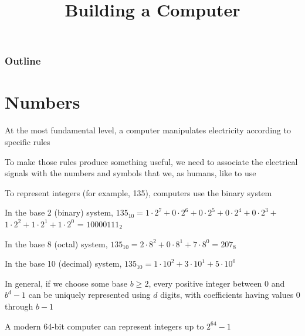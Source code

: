 \documentclass[8pt,a4paper,compress]{beamer}
\title{Building a Computer}
\date{}
\begin{document}
\begin{frame}
\vfill
\titlepage
\end{frame}

\begin{frame}
\frametitle{Outline}
\tableofcontents
\end{frame}

\section{Numbers}
\begin{frame}[fragile]
\pause

At the most fundamental level, a computer manipulates electricity according to specific rules

\pause
\bigskip

To make those rules produce something useful, we need to associate the electrical signals with the numbers and symbols that we, as humans, like to use

\pause
\bigskip

To represent integers (for example, 135), computers use the binary system

\pause
\bigskip

In the base 2 (binary) system, $135_{10} = 1 \cdot 2^7 + 0 \cdot 2^6 + 0 \cdot 2^5 + 0 \cdot 2^4 + 0 \cdot 2^3 + $ $1 \cdot 2^2 + 1 \cdot 2^1 + 1 \cdot 2^0$ = $10000111_{2}$

\pause
\bigskip

In the base 8 (octal) system, $135_{10} = 2 \cdot 8^2 + 0 \cdot 8^1 + 7 \cdot 8^0 = 207_{8}$

\pause
\bigskip

In the base 10 (decimal) system, $135_{10} = 1 \cdot 10^2 + 3 \cdot 10^1 + 5 \cdot 10^0$

\pause
\bigskip

In general, if we choose some base $b \geq 2$, every positive integer between 0 and $b^d-1$ can be uniquely represented using $d$ digits, with coefficients having values 0 through $b-1$

\pause
\bigskip

A modern 64-bit computer can represent integers up to $2^{64} - 1$
\end{frame}
\end{document}
